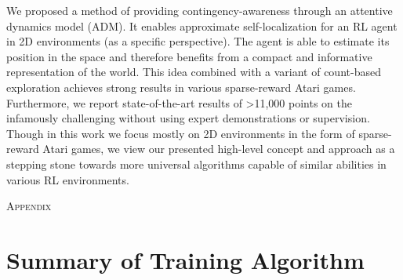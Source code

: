 \documentclass{article} \usepackage{iclr,times}
\begin{document}
{We proposed a method of providing contingency-awareness through an attentive dynamics model (ADM).
It enables approximate self-localization for an RL agent in 2D environments (as a specific perspective).
The agent is able to estimate its position in the space and therefore benefits from a compact and informative representation of the world.
This idea combined with a variant of count-based exploration achieves strong results in various sparse-reward Atari games. Furthermore, we report state-of-the-art results of >11,000 points on the infamously challenging \MontezumaRevenge without using expert demonstrations or supervision.
Though in this work we focus mostly on 2D environments in the form of sparse-reward Atari games, we view our presented high-level concept and approach as a stepping stone towards more universal algorithms capable of similar abilities in various RL environments.




 








\clearpage






\ifdefined\workshopversion \onecolumn

\thispagestyle{empty}
\makeatletter
    {\center\baselineskip 18pt
                       \bottomtitlebar}
\makeatother
\fi


{\LARGE \textsc{Appendix}}\vspace{1em}

\appendix
\vspace*{-10pt}




\section{Summary of Training Algorithm}
\label{sec:summary_algorithm}

}
\end{document}
